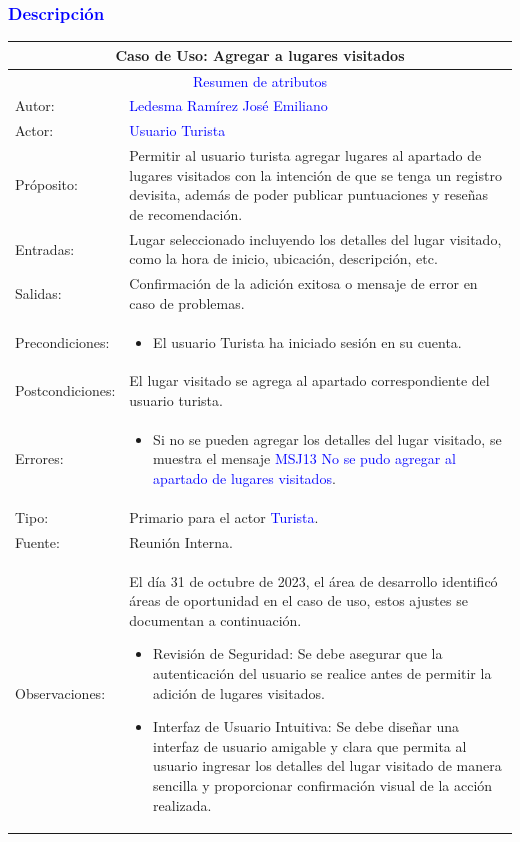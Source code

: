 \subsubsection{\textcolor{blue}{Descripción}}
\begin{tabularx}{16cm}{||l|X||}
	\hline
	\multicolumn{2}{||c||}{\textbf{Caso de Uso: Agregar a lugares visitados}} \\
	\hline
	\multicolumn{2}{||c||}{\textcolor{blue}{Resumen de atributos}} \\
	\hline
	{Autor:} & {\textcolor{blue}{Ledesma Ramírez José Emiliano}} \\
	\hline
	\hline
	{Actor:} & {\textcolor{blue}{Usuario Turista}} \\
	\hline     
	{Próposito:} & Permitir al usuario turista agregar lugares al apartado de lugares visitados con la intención de que se tenga un registro devisita, además de poder publicar puntuaciones y reseñas de recomendación.\\
	\hline
	{Entradas:} & Lugar seleccionado incluyendo los detalles del lugar visitado, como la hora de inicio, ubicación, descripción, etc.\\
	\hline
	{Salidas:} & Confirmación de la adición exitosa o mensaje de error en caso de problemas.\\
	\hline
	{Precondiciones:} & 
        \begin{itemize}
            \item El usuario Turista ha iniciado sesión en su cuenta.
        \end{itemize}\\
	\hline
	{Postcondiciones:} & El lugar visitado se agrega al apartado correspondiente del usuario turista.\\
	\hline
	{Errores:} & 
    {\begin{itemize}
            \item  Si no se pueden agregar los detalles del lugar visitado, se muestra el mensaje {\textcolor{blue}{MSJ13 No se pudo agregar al apartado de lugares visitados}}.
        \end{itemize}}\\
	\hline
	{Tipo:} & Primario para el actor {\textcolor{blue}{Turista}}.\\
	\hline
	{Fuente:} & Reunión Interna. \\
	\hline
	{Observaciones:} & El día 31 de octubre de 2023, el área de desarrollo identificó áreas de oportunidad en el caso de uso, estos ajustes se documentan a continuación.
    \begin{itemize}
        \item Revisión de Seguridad: Se debe asegurar que la autenticación del usuario se realice antes de permitir la adición de lugares visitados.
        \item Interfaz de Usuario Intuitiva: Se debe diseñar una interfaz de usuario amigable y clara que permita al usuario ingresar los detalles del lugar visitado de manera sencilla y proporcionar confirmación visual de la acción realizada.
    \end{itemize}\\
	\hline
\end{tabularx}
\vspace{300pt}
